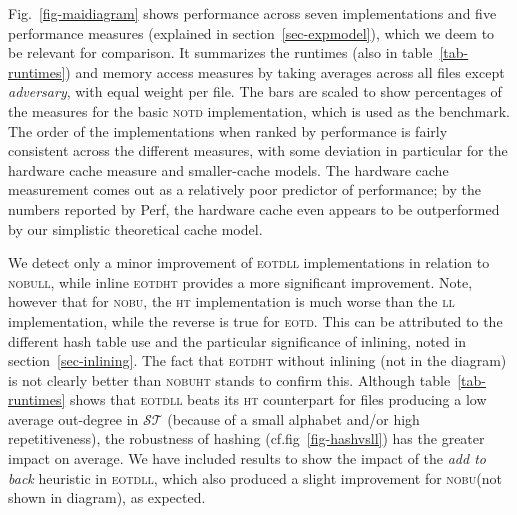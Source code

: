 \documentclass{llncs}
\newcommand\ST{{\mathcal{ST}}}
\newcommand\notd{\textsc{notd}\xspace}
\newcommand\nobu{\textsc{nobu}\xspace}
\newcommand\eotd{\textsc{eotd}\xspace}
\newcommand\lili{\textsc{ll}\xspace}
\newcommand\hata{\textsc{ht}\xspace}
\begin{document}
\begin{table}
      \caption{\label{tab-opcounts} Operation counts.  \emph{rs}: rescan branch
        operations, \emph{sl}: extra
        sibling lookup (see section~\ref{sec-siblinglookup}), \emph{move down}:
        branch operations outside of rescan. Files from the
        \emph{Pizza and Chili Corpus} ($^{\text{A}}$) and \emph{Lightweight
          Corpus} ($^{\text{B}}$). File categories are \textsc{dna}~($^{\text{1}}$),
        \textsc{xml}~($^{\text{2}}$), source code~($^{\text{3}}$), text~($^{\text{4}}$),
        \textsc{midi}~($^{\text{5}}$), proteins~($^{\text{6}}$),
        database~($^{\text{7}}$), and \nobu
        adversary~($^{\text{8}}$).}
\end{table}


Fig.~\ref{fig-maidiagram} shows performance across seven implementations and
five performance measures (explained in section~\ref{sec-expmodel}), which we
deem to be relevant for comparison. It summarizes the runtimes (also in
table~\ref{tab-runtimes}) and memory access measures by taking averages across
all files except \emph{adversary}, with equal weight per file. The bars are
scaled to show percentages of the measures for the basic \notd implementation,
which is used as the benchmark. The order of the implementations when ranked by
performance is fairly consistent across the different measures, with some
deviation in particular for the hardware cache measure and smaller-cache
models. The hardware cache measurement comes out as a relatively poor predictor
of performance; by the numbers reported by Perf, the hardware cache even appears
to be outperformed by our simplistic theoretical cache model.

We detect only a minor improvement of \eotd \lili implementations in relation to
\nobu \lili, while inline \eotd \hata provides a more significant
improvement. Note, however that for \nobu, the \hata implementation is much
worse than the \lili implementation, while the reverse is true for \eotd. This
can be attributed to the different hash table use and the particular
significance of inlining, noted in section~\ref{sec-inlining}. The fact that
\eotd \hata without inlining (not in the diagram) is not clearly better than
\nobu \hata stands to confirm this. Although table~\ref{tab-runtimes} shows that
\eotd \lili beats its \hata counterpart for files producing a low average
out-degree in $\ST$ (because of a small alphabet and/or high repetitiveness), the
robustness of hashing (cf.\@ fig~\ref{fig-hashvsll}) has the greater impact on
average. We have included results to show the impact of the \emph{add to back}
heuristic in \eotd \lili, which also produced a slight improvement for \nobu (not
shown in diagram), as expected.
\end{document}

